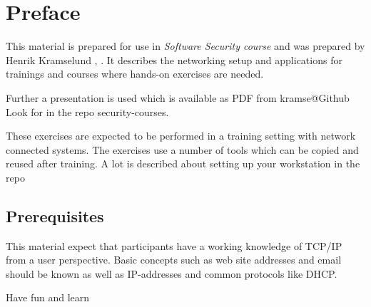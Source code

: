\documentclass[a4paper,11pt,notitlepage]{report}
\begin{document}
\rm
{}

\newcommand{\subject}[1]{Software Security course}
\newcommand{\kursus}[1]{Software Security course}
\newcommand{\kursusnavn}[1]{Software Security course\\ exercises}



\setcounter{tocdepth}{0}

\normal

{\color{titlecolor}\tableofcontents}

\normal
\pagestyle{fancyplain}
\chapter*{\color{titlecolor}Preface}

This material is prepared for use in \emph{Software Security course} and was prepared by
Henrik Kramselund  ,  .
It describes the networking setup and
applications for trainings and courses where hands-on exercises are needed.

Further a presentation is used which is available as PDF from kramse@Github\\
Look for \jobname in the repo security-courses.

These exercises are expected to be performed in a training setting with network connected systems. The exercises use a number of tools which can be copied and reused after training. A lot is described about setting up your workstation in the repo



\section*{\color{titlecolor}Prerequisites}

This material expect that participants have a working knowledge of
TCP/IP from a user perspective. Basic concepts such as web site addresses and email should be known as well as IP-addresses and common protocols like DHCP.

\vskip 1cm
Have fun and learn
\eject

\rhead{\fancyplain{}{\bf \chaptername\ \thechapter}}
\end{document}
